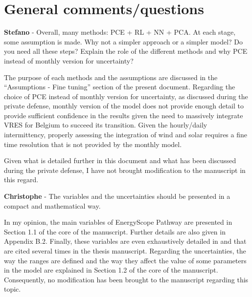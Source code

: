 \documentclass[12pt,a4paper]{article}
\begin{document}
\section{General comments/questions}
\label{General}

\begin{mdframed}[style=comment] %
{\color{orange} \textbf{Stefano}} - Overall, many methods: PCE + RL + NN + PCA. At each stage, some assumption is made. Why not a simpler approach or a simpler model? Do you need all these steps? Explain the role of the different methods and why PCE instead of monthly version for uncertainty? 
\end{mdframed}

\noindent The purpose of each methods and the assumptions are discussed in the ``Assumptions - Fine tuning'' section of the present document. Regarding the choice of PCE instead of monthly version for uncertainty, as discussed during the private defense, monthly version of the model does not provide enough detail to provide sufficient confidence in the results given the need to massively integrate VRES for Belgium to succeed its transition. Given the hourly/daily intermittency, properly assessing the integration of wind and solar requires a fine time resolution that is not provided by the monthly model. 

Given what is detailed further in this document and what has been discussed during the private defense, I have not brought modification to the manuscript in this regard.

\begin{mdframed}[style=comment] %
{\color{violet} \textbf{Christophe}} - The variables and the uncertainties should be presented in a compact and mathematical way.
\end{mdframed}

\noindent In my opinion, the main variables of EnergyScope Pathway are presented {\color{blue} in Section 1.1 of the core of the manuscript}. Further details are also given {\color{blue}in Appendix B.2}. Finally, these variables are even exhaustively detailed in \cite{limpens2019energyscope} and \cite{limpens2024pathway} that are cited several times in the thesis manuscript.  Regarding the uncertainties, the way the ranges are defined and the way they affect the value of some parameters in the model are explained {\color{blue}in Section 1.2 of the core of the manuscript}. Consequently, no modification has been brought to the manuscript regarding this topic.
\end{document}

